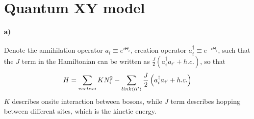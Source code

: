 \section{Quantum XY model}
\paragraph*{a)}
Denote the annihilation operator $ a_i \equiv e^{i\Theta_i}$, creation operator $ a_i^{\dagger} \equiv e^{-i\Theta_i}$, such that the $J$ term in the Hamiltonian can be written as $ \frac{J}{2} \left(a_{i}^{\dagger}a_{i'} + h.c.\right)$, so that
\begin{equation}
    H = \sum_{vertex i} K N_i^2 - \sum_{link \braket{ii'}}  \frac{J}{2} \left(a_{i}^{\dagger}a_{i'} + h.c.\right)
\end{equation}
$K$ describes onsite interaction between bosons, while $J$ term describes hopping between different sites, which is the kinetic energy.
